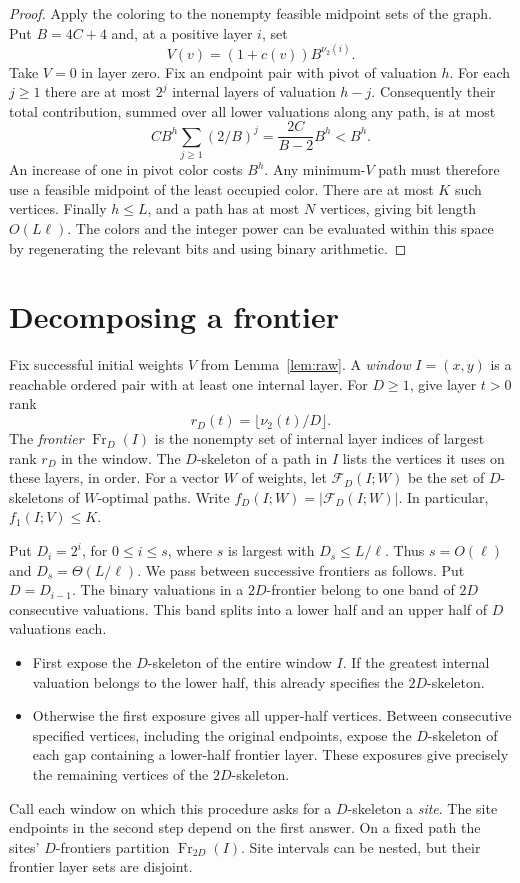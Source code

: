 \documentclass[11pt]{article}
\newcommand{\calF}{\mathcal F}
\newcommand{\fr}{\operatorname{Fr}}
\begin{document}
\begin{proof}
Apply the coloring to the nonempty feasible midpoint sets of the graph.
Put $B=4C+4$ and, at a positive layer $i$, set
\[
 V(v)=(1+c(v))B^{\nu_2(i)}.
\]
Take $V=0$ in layer zero. Fix an endpoint pair with pivot of valuation
$h$. For each $j\ge 1$ there are at most $2^j$ internal layers of
valuation $h-j$. Consequently their total contribution, summed over
all lower valuations along any path, is at most
\[
 C B^h\sum_{j\ge 1}(2/B)^j
 =\frac{2C}{B-2}B^h < B^h.
\]
An increase of one in pivot color costs $B^h$. Any minimum-$V$ path
must therefore use a feasible midpoint of the least occupied color.
There are at most $K$ such vertices. Finally $h\le L$, and a path has
at most $N$ vertices, giving bit length $O(L\ell)$. The colors and
the integer power can be evaluated within this space by regenerating
the relevant bits and using binary arithmetic.
\end{proof}
\section{Decomposing a frontier}

Fix successful initial weights $V$ from Lemma~\ref{lem:raw}. A \emph{window}
$I=(x,y)$ is a reachable ordered pair with at least one internal layer.
For $D\ge1$, give layer $t>0$ rank
\[
                   r_D(t)=\lfloor \nu_2(t)/D\rfloor .
\]
The \emph{frontier} $\fr_D(I)$ is the nonempty set of internal layer indices
of largest rank $r_D$ in the window. The $D$-skeleton of a path in $I$
lists the vertices it uses on these layers, in order. For a vector $W$
of weights, let $\calF_D(I;W)$ be the set of $D$-skeletons of $W$-optimal paths.
Write $f_D(I;W)=|\calF_D(I;W)|$. In particular, $f_1(I;V)\le K$.

Put $D_i=2^i$, for $0\le i\le s$, where $s$ is largest with
$D_s\le L/\ell$. Thus $s=O(\ell)$ and $D_s=\Theta(L/\ell)$.
We pass between successive frontiers as follows. Put $D=D_{i-1}$.
The binary valuations in a $2D$-frontier belong to one
band of $2D$ consecutive valuations. This band splits into a lower
half and an upper half of $D$ valuations each.
\begin{itemize}
\item First expose the $D$-skeleton of the entire window $I$.
If the greatest internal valuation belongs to the lower half, this
already specifies the $2D$-skeleton.
\item Otherwise the first exposure gives all upper-half vertices.
Between consecutive specified vertices, including the original endpoints,
expose the $D$-skeleton of each gap containing a lower-half frontier
layer. These exposures give precisely the remaining vertices of the
$2D$-skeleton.
\end{itemize}
Call each window on which this procedure asks for a $D$-skeleton a
\emph{site}. The site endpoints in the second step depend on the first
answer. On a fixed path the sites' $D$-frontiers partition $\fr_{2D}(I)$.
Site intervals can be nested, but their frontier layer sets are disjoint.
\end{document}
